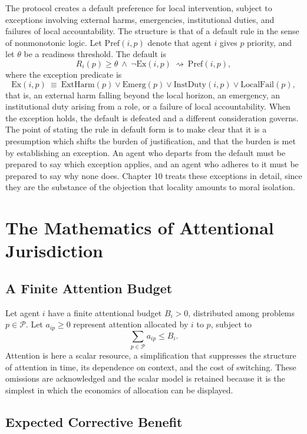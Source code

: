 \documentclass[11pt]{report}
\theoremstyle{definition}
\theoremstyle{remark}
\newcommand{\cP}{\mathcal{P}}
\begin{document}
The protocol creates a default preference for local intervention, subject to exceptions involving external harms, emergencies, institutional duties, and failures of local accountability. The structure is that of a default rule in the sense of nonmonotonic logic. Let $\mathrm{Pref}(i,p)$ denote that agent $i$ gives $p$ priority, and let $\theta$ be a readiness threshold. The default is
\[
R_i(p)\ge\theta\ \wedge\ \neg\mathrm{Ex}(i,p)\ \rightsquigarrow\ \mathrm{Pref}(i,p),
\]
where the exception predicate is
\[
\mathrm{Ex}(i,p)\ \equiv\ \mathrm{ExtHarm}(p)\vee\mathrm{Emerg}(p)\vee\mathrm{InstDuty}(i,p)\vee\mathrm{LocalFail}(p),
\]
that is, an external harm falling beyond the local horizon, an emergency, an institutional duty arising from a role, or a failure of local accountability. When the exception holds, the default is defeated and a different consideration governs. The point of stating the rule in default form is to make clear that it is a presumption which shifts the burden of justification, and that the burden is met by establishing an exception. An agent who departs from the default must be prepared to say which exception applies, and an agent who adheres to it must be prepared to say why none does. Chapter 10 treats these exceptions in detail, since they are the substance of the objection that locality amounts to moral isolation.

\chapter{The Mathematics of Attentional Jurisdiction}

\section{A Finite Attention Budget}

Let agent $i$ have a finite attentional budget $B_i>0$, distributed among problems $p\in\cP$. Let $a_{ip}\ge0$ represent attention allocated by $i$ to $p$, subject to
\[
\sum_{p\in\cP}a_{ip}\le B_i .
\]
Attention is here a scalar resource, a simplification that suppresses the structure of attention in time, its dependence on context, and the cost of switching. These omissions are acknowledged and the scalar model is retained because it is the simplest in which the economics of allocation can be displayed.

\section{Expected Corrective Benefit}
\end{document}

